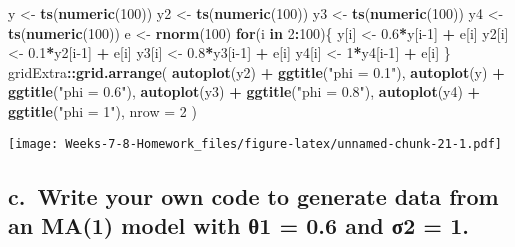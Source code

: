 \documentclass[]{article}
\newenvironment{Shaded}{\begin{snugshade}}{\end{snugshade}}
\newcommand{\ControlFlowTok}[1]{\textcolor[rgb]{0.13,0.29,0.53}{\textbf{#1}}}
\newcommand{\DataTypeTok}[1]{\textcolor[rgb]{0.13,0.29,0.53}{#1}}
\newcommand{\DecValTok}[1]{\textcolor[rgb]{0.00,0.00,0.81}{#1}}
\newcommand{\FloatTok}[1]{\textcolor[rgb]{0.00,0.00,0.81}{#1}}
\newcommand{\KeywordTok}[1]{\textcolor[rgb]{0.13,0.29,0.53}{\textbf{#1}}}
\newcommand{\NormalTok}[1]{#1}
\newcommand{\OperatorTok}[1]{\textcolor[rgb]{0.81,0.36,0.00}{\textbf{#1}}}
\newcommand{\StringTok}[1]{\textcolor[rgb]{0.31,0.60,0.02}{#1}}
\begin{document}
\begin{Shaded}
\begin{Highlighting}[]
\NormalTok{y <-}\StringTok{ }\KeywordTok{ts}\NormalTok{(}\KeywordTok{numeric}\NormalTok{(}\DecValTok{100}\NormalTok{))}
\NormalTok{y2 <-}\StringTok{ }\KeywordTok{ts}\NormalTok{(}\KeywordTok{numeric}\NormalTok{(}\DecValTok{100}\NormalTok{))}
\NormalTok{y3 <-}\StringTok{ }\KeywordTok{ts}\NormalTok{(}\KeywordTok{numeric}\NormalTok{(}\DecValTok{100}\NormalTok{))}
\NormalTok{y4 <-}\StringTok{ }\KeywordTok{ts}\NormalTok{(}\KeywordTok{numeric}\NormalTok{(}\DecValTok{100}\NormalTok{))}
\NormalTok{e <-}\StringTok{ }\KeywordTok{rnorm}\NormalTok{(}\DecValTok{100}\NormalTok{)}
\ControlFlowTok{for}\NormalTok{(i }\ControlFlowTok{in} \DecValTok{2}\OperatorTok{:}\DecValTok{100}\NormalTok{)\{}
\NormalTok{  y[i] <-}\StringTok{ }\FloatTok{0.6}\OperatorTok{*}\NormalTok{y[i}\DecValTok{-1}\NormalTok{] }\OperatorTok{+}\StringTok{ }\NormalTok{e[i]}
\NormalTok{  y2[i] <-}\StringTok{ }\FloatTok{0.1}\OperatorTok{*}\NormalTok{y2[i}\DecValTok{-1}\NormalTok{] }\OperatorTok{+}\StringTok{ }\NormalTok{e[i]}
\NormalTok{  y3[i] <-}\StringTok{ }\FloatTok{0.8}\OperatorTok{*}\NormalTok{y3[i}\DecValTok{-1}\NormalTok{] }\OperatorTok{+}\StringTok{ }\NormalTok{e[i]}
\NormalTok{  y4[i] <-}\StringTok{ }\DecValTok{1}\OperatorTok{*}\NormalTok{y4[i}\DecValTok{-1}\NormalTok{] }\OperatorTok{+}\StringTok{ }\NormalTok{e[i]}
\NormalTok{\}}
\NormalTok{gridExtra}\OperatorTok{::}\KeywordTok{grid.arrange}\NormalTok{(}
  \KeywordTok{autoplot}\NormalTok{(y2) }\OperatorTok{+}\StringTok{ }\KeywordTok{ggtitle}\NormalTok{(}\StringTok{"phi = 0.1"}\NormalTok{),}
  \KeywordTok{autoplot}\NormalTok{(y) }\OperatorTok{+}\StringTok{ }\KeywordTok{ggtitle}\NormalTok{(}\StringTok{"phi = 0.6"}\NormalTok{),}
  \KeywordTok{autoplot}\NormalTok{(y3) }\OperatorTok{+}\StringTok{ }\KeywordTok{ggtitle}\NormalTok{(}\StringTok{"phi = 0.8"}\NormalTok{),}
  \KeywordTok{autoplot}\NormalTok{(y4) }\OperatorTok{+}\StringTok{ }\KeywordTok{ggtitle}\NormalTok{(}\StringTok{"phi = 1"}\NormalTok{), }\DataTypeTok{nrow =} \DecValTok{2}
\NormalTok{)}
\end{Highlighting}
\end{Shaded}

\texttt{[image: Weeks-7-8-Homework\_files/figure-latex/unnamed-chunk-21-1.pdf]}

\hypertarget{c.-write-your-own-code-to-generate-data-from-an-ma1-model-with-1-0.6-and-2-1.}{%
\subsection{c.~Write your own code to generate data from an MA(1) model
with θ1 = 0.6 and σ2 =
1.}\label{c.-write-your-own-code-to-generate-data-from-an-ma1-model-with-1-0.6-and-2-1.}}
\end{document}
